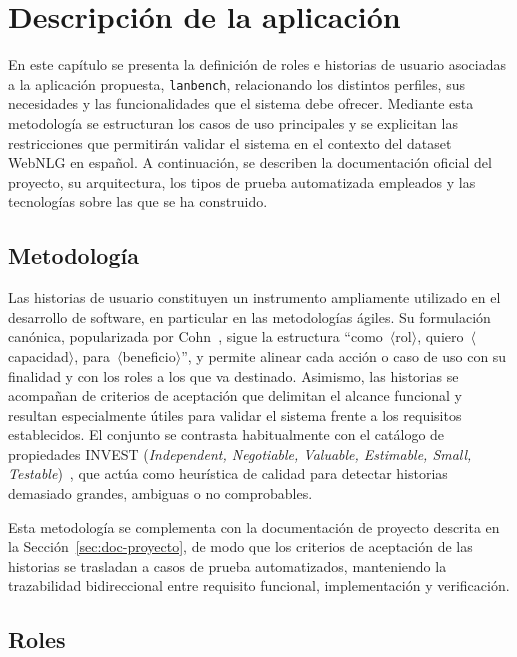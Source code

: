 
\chapter{Descripción de la aplicación}

En este capítulo se presenta la definición de roles e historias de usuario
asociadas a la aplicación propuesta, \texttt{lanbench}, relacionando los
distintos perfiles, sus necesidades y las funcionalidades que el sistema debe
ofrecer. Mediante esta metodología se estructuran los casos de uso principales
y se explicitan las restricciones que permitirán validar el sistema en el
contexto del dataset WebNLG en español. A continuación, se describen la
documentación oficial del proyecto, su arquitectura, los tipos de prueba
automatizada empleados y las tecnologías sobre las que se ha construido.

\section{Metodología}

Las historias de usuario constituyen un instrumento ampliamente utilizado en el
desarrollo de software, en particular en las metodologías ágiles. Su
formulación canónica, popularizada por Cohn~\cite{Cohn2004_UserStories}, sigue
la estructura ``como~$\langle$rol$\rangle$, quiero~$\langle$capacidad$\rangle$,
para~$\langle$beneficio$\rangle$'', y permite alinear cada acción o caso de uso
con su finalidad y con los roles a los que va destinado. Asimismo, las
historias se acompañan de criterios de aceptación que delimitan el alcance
funcional y resultan especialmente útiles para validar el sistema frente a los
requisitos establecidos. El conjunto se contrasta habitualmente con el catálogo
de propiedades INVEST (\textit{Independent, Negotiable, Valuable, Estimable,
	Small, Testable})~\cite{Cohn2004_UserStories}, que actúa como heurística de
calidad para detectar historias demasiado grandes, ambiguas o no comprobables.

Esta metodología se complementa con la documentación de proyecto descrita en la
Sección~\ref{sec:doc-proyecto}, de modo que los criterios de aceptación de las
historias se trasladan a casos de prueba automatizados, manteniendo la
trazabilidad bidireccional entre requisito funcional, implementación y
verificación.

\section{Roles}

